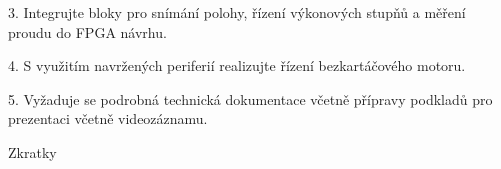 3. Integrujte bloky pro snímání polohy, řízení výkonových stupňů a měření proudu do FPGA návrhu.

4. S využitím navržených periferií realizujte řízení bezkartáčového motoru.

5. Vyžaduje se podrobná technická dokumentace včetně přípravy podkladů pro prezentaci včetně videozáznamu.

\app Zkratky\par \makeglos %



 
 
 \bye
  
 